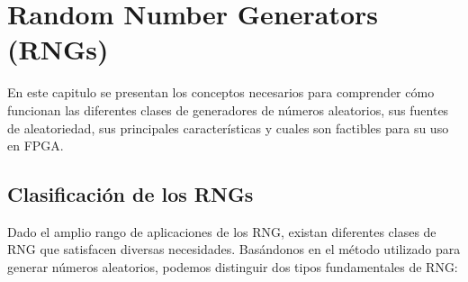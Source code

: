 \chapter{Random Number Generators (RNGs)}

    En este capitulo se presentan los conceptos necesarios para comprender cómo funcionan las diferentes clases de generadores de números aleatorios, sus fuentes de aleatoriedad, sus principales características y cuales son factibles para su uso en FPGA.

    \section{Clasificación de los RNGs}

        Dado el amplio rango de aplicaciones de los RNG, existan diferentes clases de RNG que satisfacen diversas necesidades. Basándonos en el método utilizado para generar números aleatorios, podemos distinguir dos tipos fundamentales de RNG:
	        
